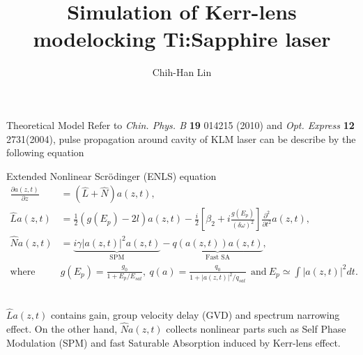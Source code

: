 \documentclass[8pt]{beamer}
\title{Simulation of Kerr-lens modelocking Ti:Sapphire laser}
\author{Chih-Han Lin}
\institute{Applied Physics Department, National Taiwan University}
\begin{document}
\begin{frame}
\titlepage
\end{frame}

\begin{frame}{Theoretical Model}
Refer to \textit{Chin. Phys. B} \textbf{19} 014215 (2010) and \textit{Opt. Express} \textbf{12} 2731(2004), pulse propagation around cavity of KLM laser can be describe by the following equation
    
\begin{block}{Extended Nonlinear Scr\"{o}dinger (ENLS) equation}
\begin{align*}
\frac{\partial a(z,t)}{\partial z}&=(\hat{L}+\hat{N})a(z,t),\\
\hat{L}a(z,t)&=\frac{1}{2}(g(E_p)-2l)a(z,t)-\frac{i}{2}\left[\beta_2+i\frac{g(E_p)}{(\delta\omega)^2}\right]\frac{\partial^2}{\partial t^2}a(z,t),\\
\hat{N}a(z,t)&=\underbrace{i\gamma|a(z,t)|^2a(z,t)}_{\mbox{SPM}}-\underbrace{q(a(z,t))a(z,t)}_{\mbox{Fast SA}},\\
\mbox{where}~~&g(E_p)=\frac{g_0}{1+E_p/E_{sat}},~q(a)=\frac{q_0}{1+|a(z,t)|^2/q_{sat}}~~\mbox{and}~ E_p\simeq \int |a(z,t)|^2 dt. 
\end{align*}
\end{block}
\\[+5pt]
$\hat{L}a(z,t)$ contains gain, group velocity delay (GVD) and spectrum narrowing effect. On the other hand, $\hat{N}a(z,t)$ collects nonlinear parts such as Self Phase Modulation (SPM) and fast Saturable Absorption induced by Kerr-lens effect.

\end{frame}
\end{document}
